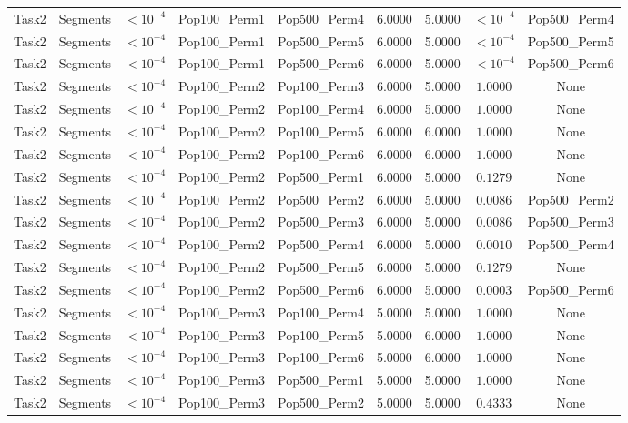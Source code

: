 \documentclass[8pt]{article}
\begin{document}
\begin{longtable}{llccccccc}
Task2 & Segments & $< 10^{-4}$ & Pop100\_Perm1 & Pop500\_Perm4 & 6.0000 & 5.0000 & $< 10^{-4}$ & Pop500\_Perm4 \\
Task2 & Segments & $< 10^{-4}$ & Pop100\_Perm1 & Pop500\_Perm5 & 6.0000 & 5.0000 & $< 10^{-4}$ & Pop500\_Perm5 \\
Task2 & Segments & $< 10^{-4}$ & Pop100\_Perm1 & Pop500\_Perm6 & 6.0000 & 5.0000 & $< 10^{-4}$ & Pop500\_Perm6 \\
Task2 & Segments & $< 10^{-4}$ & Pop100\_Perm2 & Pop100\_Perm3 & 6.0000 & 5.0000 & $1.0000$ & None \\
Task2 & Segments & $< 10^{-4}$ & Pop100\_Perm2 & Pop100\_Perm4 & 6.0000 & 5.0000 & $1.0000$ & None \\
Task2 & Segments & $< 10^{-4}$ & Pop100\_Perm2 & Pop100\_Perm5 & 6.0000 & 6.0000 & $1.0000$ & None \\
Task2 & Segments & $< 10^{-4}$ & Pop100\_Perm2 & Pop100\_Perm6 & 6.0000 & 6.0000 & $1.0000$ & None \\
Task2 & Segments & $< 10^{-4}$ & Pop100\_Perm2 & Pop500\_Perm1 & 6.0000 & 5.0000 & $0.1279$ & None \\
Task2 & Segments & $< 10^{-4}$ & Pop100\_Perm2 & Pop500\_Perm2 & 6.0000 & 5.0000 & $0.0086$ & Pop500\_Perm2 \\
Task2 & Segments & $< 10^{-4}$ & Pop100\_Perm2 & Pop500\_Perm3 & 6.0000 & 5.0000 & $0.0086$ & Pop500\_Perm3 \\
Task2 & Segments & $< 10^{-4}$ & Pop100\_Perm2 & Pop500\_Perm4 & 6.0000 & 5.0000 & $0.0010$ & Pop500\_Perm4 \\
Task2 & Segments & $< 10^{-4}$ & Pop100\_Perm2 & Pop500\_Perm5 & 6.0000 & 5.0000 & $0.1279$ & None \\
Task2 & Segments & $< 10^{-4}$ & Pop100\_Perm2 & Pop500\_Perm6 & 6.0000 & 5.0000 & $0.0003$ & Pop500\_Perm6 \\
Task2 & Segments & $< 10^{-4}$ & Pop100\_Perm3 & Pop100\_Perm4 & 5.0000 & 5.0000 & $1.0000$ & None \\
Task2 & Segments & $< 10^{-4}$ & Pop100\_Perm3 & Pop100\_Perm5 & 5.0000 & 6.0000 & $1.0000$ & None \\
Task2 & Segments & $< 10^{-4}$ & Pop100\_Perm3 & Pop100\_Perm6 & 5.0000 & 6.0000 & $1.0000$ & None \\
Task2 & Segments & $< 10^{-4}$ & Pop100\_Perm3 & Pop500\_Perm1 & 5.0000 & 5.0000 & $1.0000$ & None \\
Task2 & Segments & $< 10^{-4}$ & Pop100\_Perm3 & Pop500\_Perm2 & 5.0000 & 5.0000 & $0.4333$ & None \\

\end{longtable}
\end{document}
